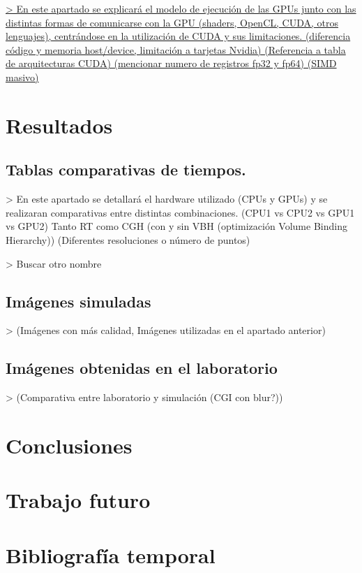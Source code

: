 \documentclass[10pt, a4paper]{article}
\begin{document}
\underline{> En este apartado se explicará el modelo de ejecución de las GPUs junto con las distintas formas de comunicarse con la GPU (shaders, OpenCL, CUDA, otros lenguajes), centrándose en la utilización de CUDA y sus limitaciones. (diferencia código y memoria host/device, limitación a tarjetas Nvidia) (Referencia a tabla de arquitecturas CUDA) (mencionar numero de registros fp32 y fp64) (SIMD masivo)}



\section{Resultados}

\subsection{Tablas comparativas de tiempos.}

> En este apartado se detallará el hardware utilizado (CPUs y GPUs) y se realizaran comparativas entre distintas combinaciones. (CPU1 vs CPU2 vs GPU1 vs GPU2) Tanto RT como CGH (con y sin VBH (optimización Volume Binding Hierarchy)) (Diferentes resoluciones o número de puntos)

> Buscar otro nombre

\subsection{Imágenes simuladas}

> (Imágenes con más calidad, Imágenes utilizadas en el apartado anterior)

\subsection{Imágenes obtenidas en el laboratorio}

> (Comparativa entre laboratorio y simulación (CGI con blur?))

\section{Conclusiones}

\section{Trabajo futuro}

\section*{Bibliografía temporal}
\end{document}
